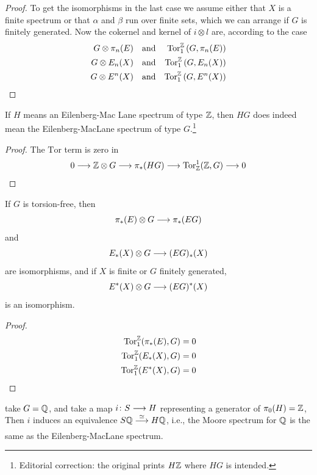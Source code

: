 \documentclass[../main]{subfiles}
\begin{document}
\begin{proof}
To get the isomorphisms in the last case we assume either that $X$ is a finite spectrum or that $\alpha$ and $\beta$ run over finite sets, which we can arrange if $G$ is finitely generated. Now the cokernel and kernel of $i\otimes l$ are, according to the case
\begin{align}
    G\otimes \pi_n(E) && \text{and} && \mathrm{Tor}_1^{\mathbb{Z}} \left( G, \pi_n(E) \right) \nonumber \\
    G\otimes E_n(X) && \text{and} && \mathrm{Tor}_1^{\mathbb{Z}} \left( G, E_n(X) \right) \nonumber \\
    G\otimes E^n(X) && \text{and} && \mathrm{Tor}_1^{\mathbb{Z}} \left( G, E^n(X) \right) \nonumber
\end{align}
\end{proof}

\begin{example}
If $H$ means an Eilenberg-Mac Lane spectrum of type $\mathbb{Z}$, then $HG$ does indeed mean the Eilenberg-MacLane spectrum of type $G$.\footnote{Editorial correction: the original prints $H\mathbb{Z}$ where $HG$ is intended.}
\end{example}

\begin{proof}
The $\mathrm{Tor}$ term is zero in
\[0\longrightarrow \mathbb{Z}\otimes G\longrightarrow \pi_\ast(HG)\longrightarrow \mathrm{Tor}_{\mathbb{Z}}^1(\mathbb{Z}, G)\longrightarrow 0\]
\end{proof}


\begin{proposition}\label{prop:p3c06.7}
If $G$ is torsion-free, then
\[\pi_\ast (E)\otimes G\longrightarrow \pi_\ast(EG)\]
and
\[E_\ast(X)\otimes G\longrightarrow (EG)_\ast(X)\]
are isomorphisms, and if $X$ is finite or $G$ finitely generated,
\[E^\ast(X)\otimes G\longrightarrow (EG)^\ast (X)\]
is an isomorphism.
\end{proposition}

\begin{proof}
\begin{align}
    \mathrm{Tor}_1^{\mathbb{Z}}(\pi_\ast(E), G) &= 0 \nonumber \\
    \mathrm{Tor}_1^{\mathbb{Z}}(E_\ast(X), G) &= 0 \nonumber \\
    \mathrm{Tor}_1^{\mathbb{Z}}(E^\ast(X), G) &= 0 \nonumber
\end{align}
\end{proof}

\begin{example}
take $G=\mathbb{Q}$, and take a map $i\colon S \longrightarrow H$ representing a generator of $\pi_0(H)=\mathbb{Z}$, Then $i$ induces an equivalence $S\bQ\vra{\simeq}H\bQ$, i.e., the Moore spectrum for $\mathbb{Q}$ is the same as the Eilenberg-MacLane spectrum.
\end{example}
\end{document}
